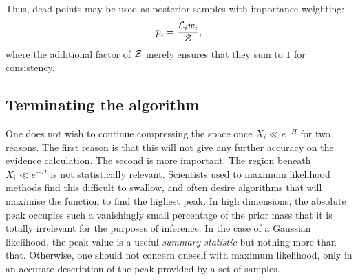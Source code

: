 Thus, dead points may be used as posterior samples with importance weighting:
\begin{equation}
  p_i = \frac{\mathcal{L}_i w_i}{\mathcal{Z}},
  \label{eqn:bay:posterior_weight}
\end{equation}
where the additional factor of \(\mathcal{Z}\) merely ensures that they sum to \(1\) for consistency.



\subsection{Terminating the algorithm}
One does not wish to continue compressing the space once \(X_i\ll e^{-H}\) for two reasons. The first reason is that this will not give any further accuracy on the evidence calculation. The second is more important. The region beneath \(X_i\ll e^{-H}\) is not statistically relevant. Scientists used to maximum likelihood methods find this difficult to swallow, and often desire algorithms that will maximise the function to find the highest peak. In high dimensions, the absolute peak occupies such a vanishingly small percentage of the prior mass that it is totally irrelevant for the purposes of inference. In the case of a Gaussian likelihood, the peak value is a useful {\em summary statistic\/} but nothing more than that. Otherwise, one should not concern oneself with maximum likelihood, only in an accurate description of the peak provided by a set of samples.

